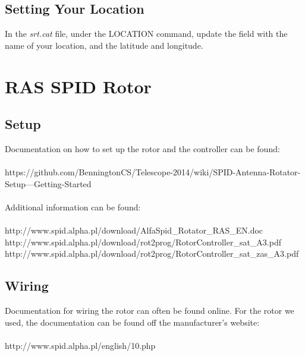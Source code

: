 \documentclass[11pt]{article} %
\begin{document}
\subsection{Setting Your Location}

In the \emph{srt.cat} file, under the LOCATION command, update the field with the name of your location, and the latitude and longitude. 






\newpage
\section{RAS SPID Rotor}

\subsection{Setup}

Documentation on how to set up the rotor and the controller can be found: \\ \\
https://github.com/BenningtonCS/Telescope-2014/wiki/SPID-Antenna-Rotator-Setup---Getting-Started
\\ \\
Additional information can be found: \\ \\
http://www.spid.alpha.pl/download/AlfaSpid\_Rotator\_RAS\_EN.doc \\
http://www.spid.alpha.pl/download/rot2prog/RotorController\_sat\_A3.pdf \\
http://www.spid.alpha.pl/download/rot2prog/RotorController\_sat\_zas\_A3.pdf \\




\subsection{Wiring}


Documentation for wiring the rotor can often be found online. For the rotor we used, the documentation can be found off the manufacturer's website:
\\ \\
http://www.spid.alpha.pl/english/10.php
\end{document}
